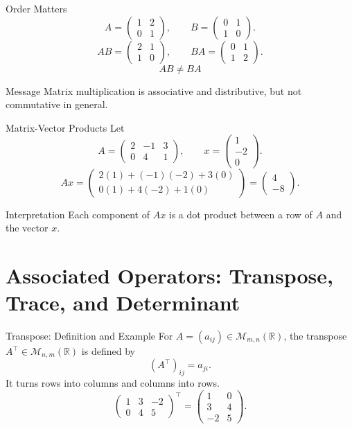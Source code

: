 \documentclass[aspectratio=169]{beamer}
\newcommand{\R}{\mathbb{R}}
\newcommand{\M}{\mathcal{M}}
\begin{document}
\begin{frame}{Order Matters}
\[
A=\begin{pmatrix}1&2\\0&1\end{pmatrix},
\qquad
B=\begin{pmatrix}0&1\\1&0\end{pmatrix}.
\]
\pause
\[
AB=\begin{pmatrix}2&1\\1&0\end{pmatrix},
\qquad
BA=\begin{pmatrix}0&1\\1&2\end{pmatrix}.
\]
\pause
\[
\boxed{AB\neq BA}
\]
\begin{block}{Message}
Matrix multiplication is associative and distributive, but not commutative in general.
\end{block}
\end{frame}

\begin{frame}{Matrix-Vector Products}
Let
\[
A=\begin{pmatrix}2&-1&3\\0&4&1\end{pmatrix},
\qquad
x=\begin{pmatrix}1\\-2\\0\end{pmatrix}.
\]
\pause
\[
Ax=
\begin{pmatrix}
2(1)+(-1)(-2)+3(0)\\
0(1)+4(-2)+1(0)
\end{pmatrix}
=
\begin{pmatrix}4\\-8\end{pmatrix}.
\]
\pause
\begin{block}{Interpretation}
Each component of $Ax$ is a dot product between a row of $A$ and the vector $x$.
\end{block}
\end{frame}

\section{Associated Operators: Transpose, Trace, and Determinant}

\begin{frame}{Transpose: Definition and Example}
For $A=(a_{ij})\in\M_{m,n}(\R)$, the transpose $A^\top\in\M_{n,m}(\R)$ is
defined by
\[
(A^\top)_{ij}=a_{ji}.
\]
It turns rows into columns and columns into rows.
\pause
\[
\begin{pmatrix}1&3&-2\\0&4&5\end{pmatrix}^{\!\top}
=\begin{pmatrix}1&0\\3&4\\-2&5\end{pmatrix}.
\]
\end{frame}
\end{document}

